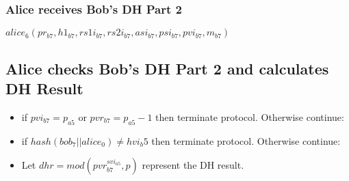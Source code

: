 \documentclass[11pt]{article}
\begin{document}
  \subsubsection{Alice receives Bob's DH Part 2}
  $alice_6(pr_{b7},h1_{b7},rs1i_{b7},rs2i_{b7},asi_{b7},
           psi_{b7},pvi_{b7},m_{b7})$
  \subsection*{Alice checks Bob's DH Part 2 and calculates DH 
               Result}
  \begin{itemize}
    \item if $pvi_{b7} = p_{a5}$ or $pvr_{b7} = p_{a5} - 1$ then 
          terminate protocol. Otherwise continue:
    \item if $hash(bob_7 || alice_0) \neq hvi_b5$ then terminate 
          protocol. Otherwise continue:
    \item Let $dhr = mod(pvr_{b7}^{svi_{a5}},p)$ represent the 
          DH result.
  \end{itemize}
\end{document}
